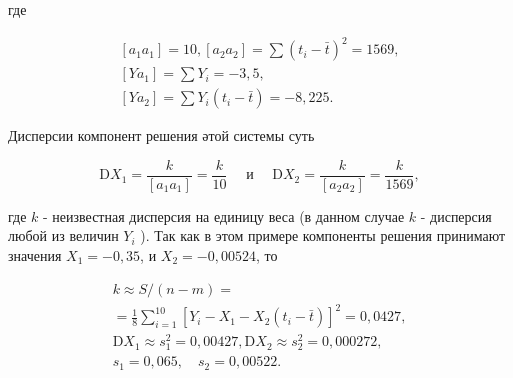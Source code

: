 \documentclass[10pt]{article}
\begin{document}
где



\[

\begin{gathered}

{\left[a_{1} a_{1}\right]=10,\left[a_{2} a_{2}\right]=\sum\left(t_{i}-\bar{t}\right)^{2}=1569,} \\

{\left[Y a_{1}\right]=\sum Y_{i}=-3,5,} \\

{\left[Y a_{2}\right]=\sum Y_{i}\left(t_{i}-\bar{t}\right)=-8,225 .}

\end{gathered}

\]



Дисперсии компонент решения әтой системы суть



\[

\mathrm{D} X_{1}=\frac{k}{\left[a_{1} a_{1}\right]}=\frac{k}{10} \quad \text { и } \quad \mathrm{D} X_{2}=\frac{k}{\left[a_{2} a_{2}\right]}=\frac{k}{1569},

\]



где $k$ - неизвестная дисперсия на единицу веса (в данном случае $k$ - дисперсия любой из величин $Y_{i}$ ). Так как в этом примере компоненты решения принимают значения $X_{1}=-0,35$, и $X_{2}=-0,00524$, то



\[

\begin{gathered}

k \approx S /(n-m)= \\

=\frac{1}{8} \sum_{i=1}^{10}\left[Y_{i}-X_{1}-X_{2}\left(t_{i}-\bar{t}\right)\right]^{2}=0,0427, \\

\mathrm{D} X_{1} \approx s_{1}^{2}=0,00427, \mathrm{D} X_{2} \approx s_{2}^{2}=0,000272, \\

s_{1}=0,065, \quad s_{2}=0,00522 .

\end{gathered}

\]
\end{document}
